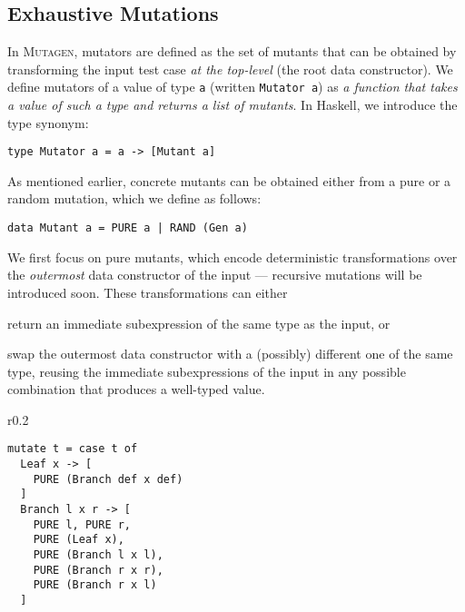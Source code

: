 \documentclass[sigconf,review,anonymous]{acmart}
\newcommand{\fuzzchick}{\textit{FuzzChick}\xspace}
\newcommand{\mutagen}{\textsc{Mutagen}\xspace}
\begin{document}
\subsection{Exhaustive Mutations}


In \mutagen, mutators are defined as the set of mutants that can be obtained by
transforming the input test case \emph{at the top-level} (the root data
constructor).
%
We define mutators of a value of type \texttt{a} (written \texttt{Mutator a}) as
\emph{a function that takes a value of such a type and returns a list of
mutants}.
%
In Haskell, we introduce the type synonym:
%
\begin{verbatim}
type Mutator a = a -> [Mutant a]
\end{verbatim}
%
\noindent As mentioned earlier, concrete mutants can be obtained either from a
pure or a random mutation, which we define as follows:

\begin{verbatim}
data Mutant a = PURE a | RAND (Gen a)
\end{verbatim}

We first focus on pure mutants, which 
%
encode deterministic transformations over the \emph{outermost} data constructor
of the input --- recursive mutations will be introduced soon.
%
These transformations can either
%
\begin{inparaenum}
\item return an immediate subexpression of the same type as the input, or
\item swap the outermost data constructor with a (possibly) different one of the
  same type, reusing the immediate subexpressions of the input in any possible
  combination that produces a well-typed value.  
\end{inparaenum}


\setlength{\intextsep}{10pt}%
\setlength{\columnsep}{10pt}%
\begin{wrapfigure}{r}{0.2\textwidth}
\vspace{-20pt}
\begin{verbatim}
mutate t = case t of 
  Leaf x -> [ 
    PURE (Branch def x def)
  ]
  Branch l x r -> [ 
    PURE l, PURE r, 
    PURE (Leaf x), 
    PURE (Branch l x l),
    PURE (Branch r x r),
    PURE (Branch r x l)
  ]
\end{verbatim}
\vspace{-10pt}
\caption{\label{fig:mutagen:mutator}\mutagen mutator for the \texttt{Tree} data
  type.}
\vspace{-20pt}
\end{wrapfigure}
\end{document}
